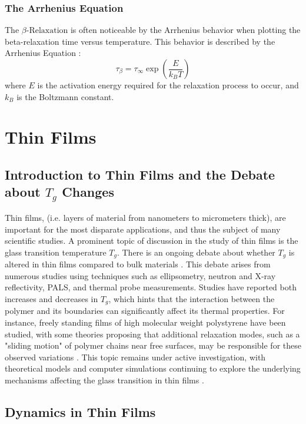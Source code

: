 \subsubsection{The Arrhenius Equation}

The $\beta\text{-Relaxation}$ is often noticeable by the Arrhenius behavior when plotting the beta-relaxation time versus temperature. This behavior is described by the Arrhenius Equation \cite{zhao2023}:
\begin{equation}
\tau_{\beta} = \tau_{\infty} \exp\left(\frac{E}{k_B T}\right)
\end{equation}
where \(E\) is the activation energy required for the relaxation process to occur, and \(k_B\) is the Boltzmann constant.

\section{Thin Films}
\subsection{Introduction to Thin Films and the Debate about $T_g$ Changes}
Thin films, (i.e. layers of material from nanometers to micrometers thick), are important for the most disparate applications, and thus the subject of many scientific studies. A prominent topic of discussion in the study of thin films is the glass transition temperature \(T_g\). There is an ongoing debate about whether \(T_g\) is altered in thin films compared to bulk materials \cite{serghei}. This debate arises from numerous studies using techniques such as ellipsometry, neutron and X-ray reflectivity, \ac{PALS}, and thermal probe measurements. Studies have reported both increases and decreases in \(T_g\), which hints that the interaction between the polymer and its boundaries can significantly affect its thermal properties. For instance, freely standing films of high molecular weight polystyrene have been studied, with some theories proposing that additional relaxation modes, such as a "sliding motion" of polymer chains near free surfaces, may be responsible for these observed variations \cite{FUJITA}. This topic remains under active investigation, with theoretical models and computer simulations continuing to explore the underlying mechanisms affecting the glass transition in thin films \cite{kremer2003}.
\subsection{Dynamics in Thin Films}


